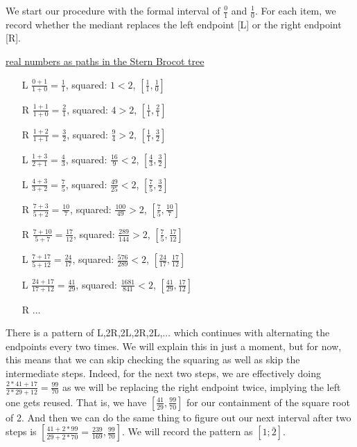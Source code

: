 \documentclass[12pt]{article}
\theoremstyle{remark}
\begin{document}
We start our procedure with the formal interval of $\tfrac{0}{1}$ and $\tfrac{1}{0}$. For each item, we record whether the mediant replaces the left endpoint [L] or the right endpoint [R].

\href{https://mattbaker.blog/2019/01/28/the-stern-brocot-tree-hurwitzs-theorem-and-the-markoff-uniqueness-conjecture/}{real numbers as paths in the Stern Brocot tree}


\begin{itemize}
    \item[L] $\tfrac{0+1}{1+0} = \tfrac{1}{1}$, squared: $1 < 2$,  $[\tfrac{1}{1},\tfrac{1}{0}] $
    \item[R] $\tfrac{1+1}{1+0} = \tfrac{2}{1}$, squared: $4 > 2$, $[\tfrac{1}{1},\tfrac{2}{1}]$
    \item[R] $\tfrac{1+2}{1+1} = \tfrac{3}{2}$, squared: $\tfrac{9}{4} > 2$, $[\tfrac{1}{1},\tfrac{3}{2}]$
    \item[L] $\tfrac{1+3}{2+1} = \tfrac{4}{3}$, squared: $\tfrac{16}{9} < 2$, $[\tfrac{4}{3},\tfrac{3}{2}]$
    \item[L] $\tfrac{4+3}{3+2} = \tfrac{7}{5}$, squared: $\tfrac{49}{25} < 2$, 
    $[\tfrac{7}{5},\tfrac{3}{2}]$
    \item[R] $\tfrac{7+3}{5+2} = \tfrac{10}{7}$, squared: $\tfrac{100}{49} > 2$, 
    $[\tfrac{7}{5},\tfrac{10}{7}]$
    \item[R] $\tfrac{7+10}{5+7} = \tfrac{17}{12}$, squared: $\tfrac{289}{144} > 2$, 
    $[\tfrac{7}{5},\tfrac{17}{12}]$
    \item[L] $\tfrac{7+17}{5+12} = \tfrac{24}{17}$, squared: $\tfrac{576}{289} < 2$, 
    $[\tfrac{24}{17},\tfrac{17}{12}]$
    \item[L] $\tfrac{24+17}{17+12} = \tfrac{41}{29}$, squared: $\tfrac{1681}{841} < 2$, 
    $[\tfrac{41}{29},\tfrac{17}{12}]$
    \item[R] $\ldots$
\end{itemize}

There is a pattern of L,2R,2L,2R,2L,$\ldots$ which continues with alternating the endpoints every two times. We will explain this in just a moment, but for now, this means that we can skip checking the squaring as well as skip the intermediate steps. Indeed, for the next two steps, we are effectively doing $\tfrac{2*41 + 17}{2*29 + 12} = \tfrac{99}{70}$ as we will be replacing the right endpoint twice, implying the left one gets reused. That is, we have $[\tfrac{41}{29}, \tfrac{99}{70}]$ for our containment of the square root of 2. And then we can do the same thing to figure out our next interval after two steps is $[\tfrac{41+2*99}{29+2*70}=\tfrac{239}{169}, \tfrac{99}{70}]$. We will record the pattern as $[1; \bar{2}]$.
\end{document}
